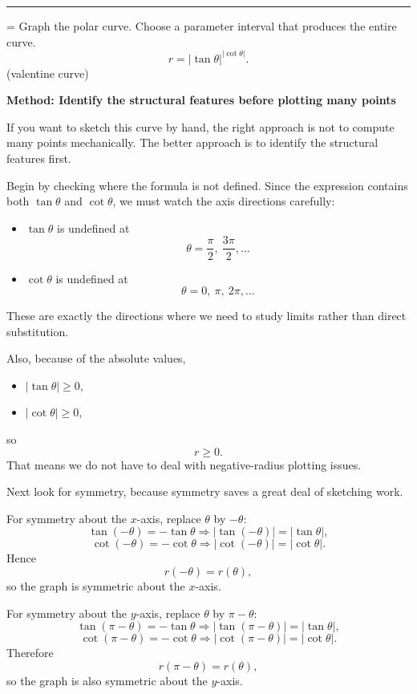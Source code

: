 \documentclass[a4paper,12pt,twocolumn]{article}
\newlength{\problemnumberwidth}
\newenvironment{solutionbox}{\begin{framed}}{\end{framed}}
\newcommand{\sectiontitle}[2]{%
  \hypertarget{#1}{}%
  \par\vspace{0.8em}%
  \noindent{\Large\bfseries #2}\par
  \vspace{0.3em}%
  \hrule
  \vspace{0.8em}%
}
\newcommand{\problem}[3]{%
  \Needspace{10\baselineskip}%
  \phantomsection\label{#1}%
  \par\vspace{0.8em}%
  \noindent
  \hangindent=\problemnumberwidth
  \hangafter=1
  \makebox[\problemnumberwidth][l]{\textbf{#2.}}#3\par
}
\begin{document}
\sectiontitle{sec:4}{10-4}

\problem{prob:10-4-62}{62}{Graph the polar curve. Choose a parameter interval that produces the entire curve.
\[
r=\lvert\tan\theta\rvert^{\lvert\cot\theta\rvert}.
\]
\noindent(valentine curve)}

\begin{solutionbox}
\textbf{Method: Identify the structural features before plotting many points}

\begin{steps}
\item If you want to sketch this curve by hand, the right approach is not to compute many points mechanically. The better approach is to identify the structural features first.

Begin by checking where the formula is not defined. Since the expression contains both \(\tan\theta\) and \(\cot\theta\), we must watch the axis directions carefully:
\begin{itemize}[leftmargin=*]
\item \(\tan\theta\) is undefined at
\[
\theta=\frac{\pi}{2},\ \frac{3\pi}{2},\dots
\]
\item \(\cot\theta\) is undefined at
\[
\theta=0,\ \pi,\ 2\pi,\dots
\]
\end{itemize}
These are exactly the directions where we need to study limits rather than direct substitution.

Also, because of the absolute values,
\begin{itemize}[leftmargin=*]
\item \(\lvert\tan\theta\rvert\ge 0\),
\item \(\lvert\cot\theta\rvert\ge 0\),
\end{itemize}
so
\[
r\ge 0.
\]
That means we do not have to deal with negative-radius plotting issues.

\item Next look for symmetry, because symmetry saves a great deal of sketching work.

For symmetry about the \(x\)-axis, replace \(\theta\) by \(-\theta\):
\[
\tan(-\theta)=-\tan\theta \Rightarrow \lvert\tan(-\theta)\rvert=\lvert\tan\theta\rvert,
\]
\[
\cot(-\theta)=-\cot\theta \Rightarrow \lvert\cot(-\theta)\rvert=\lvert\cot\theta\rvert.
\]
Hence
\[
r(-\theta)=r(\theta),
\]
so the graph is symmetric about the \(x\)-axis.

For symmetry about the \(y\)-axis, replace \(\theta\) by \(\pi-\theta\):
\[
\tan(\pi-\theta)=-\tan\theta \Rightarrow \lvert\tan(\pi-\theta)\rvert=\lvert\tan\theta\rvert,
\]
\[
\cot(\pi-\theta)=-\cot\theta \Rightarrow \lvert\cot(\pi-\theta)\rvert=\lvert\cot\theta\rvert.
\]
Therefore
\[
r(\pi-\theta)=r(\theta),
\]
so the graph is also symmetric about the \(y\)-axis.


\end{steps}
\end{solutionbox}
\end{document}
